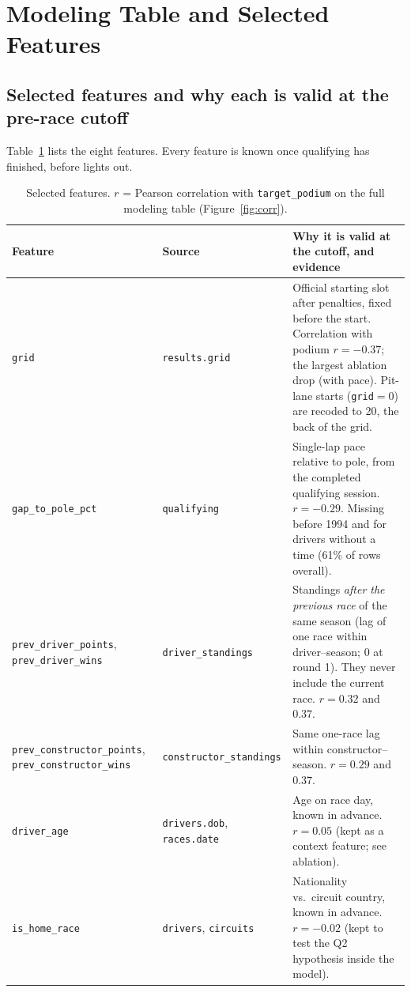 \documentclass[11pt,a4paper]{article}
\newcommand{\ft}[1]{\texttt{#1}}
\begin{document}
\section{Modeling Table and Selected Features}

\subsection{Selected features and why each is valid at the pre-race cutoff}
Table~\ref{tab:features} lists the eight features. Every feature is known once qualifying has finished, before lights out.

\begin{table}[!htbp]
\centering\small
\begin{tabular}{>{\raggedright\arraybackslash}p{4.3cm}>{\raggedright\arraybackslash}p{2.9cm}>{\raggedright\arraybackslash}p{7.2cm}}
\toprule
\textbf{Feature} & \textbf{Source} & \textbf{Why it is valid at the cutoff, and evidence} \\
\midrule
\ft{grid} & \ft{results.grid} & Official starting slot after penalties, fixed before the start. Correlation with podium $r=-0.37$; the largest ablation drop (with pace). Pit-lane starts (\ft{grid}$=0$) are recoded to 20, the back of the grid. \\
\ft{gap\_to\_pole\_pct} & \ft{qualifying} & Single-lap pace relative to pole, from the completed qualifying session. $r=-0.29$. Missing before 1994 and for drivers without a time (61\% of rows overall). \\
\ft{prev\_driver\_points}, \ft{prev\_driver\_wins} & \ft{driver\_standings} & Standings \emph{after the previous race} of the same season (lag of one race within driver--season; 0 at round 1). They never include the current race. $r=0.32$ and $0.37$. \\
\ft{prev\_constructor\_points}, \ft{prev\_constructor\_wins} & \ft{constructor\_\-standings} & Same one-race lag within constructor--season. $r=0.29$ and $0.37$. \\
\ft{driver\_age} & \ft{drivers.dob}, \ft{races.date} & Age on race day, known in advance. $r=0.05$ (kept as a context feature; see ablation). \\
\ft{is\_home\_race} & \ft{drivers}, \ft{circuits} & Nationality vs.\ circuit country, known in advance. $r=-0.02$ (kept to test the Q2 hypothesis inside the model). \\
\bottomrule
\end{tabular}
\caption{Selected features. $r$ = Pearson correlation with \ft{target\_podium} on the full modeling table (Figure~\ref{fig:corr}).}
\label{tab:features}
\end{table}
\end{document}
